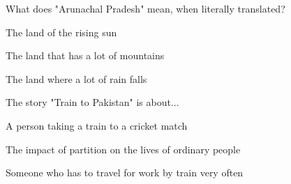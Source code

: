 \begin{enhancedmcq}{What does "Arunachal Pradesh" mean, when literally translated?}
\item The land of the rising sun
\item The land that has a lot of mountains
\item The land where a lot of rain falls

\end{enhancedmcq}
\begin{enhancedmcq}{The story "Train to Pakistan" is about...}
\item A person taking a train to a cricket match
\item The impact of partition on the lives of ordinary people
\item Someone who has to travel for work by train very often
\end{enhancedmcq}